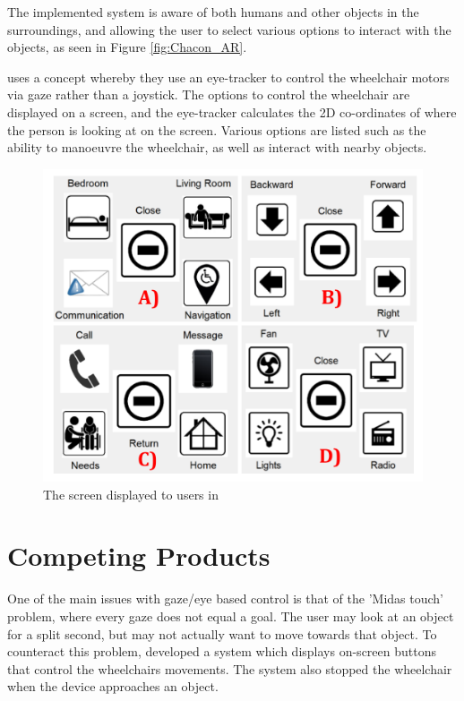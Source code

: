 \documentclass[12pt,a4paper]{report}
\begin{document}
The implemented system is aware of both humans and other objects in the surroundings, and allowing the user to select various options to interact with the objects, as seen in Figure \ref{fig:Chacon_AR}.


\cite{H.Montenegro-Couto2018} uses a concept whereby they use an eye-tracker to control the wheelchair motors via gaze rather than a joystick. The options to control the wheelchair are displayed on a screen, and the eye-tracker calculates the 2D co-ordinates of where the person is looking at on the screen. Various options are listed such as the ability to manoeuvre the wheelchair, as well as interact with nearby objects.

\begin{figure}[h!]
	\begin{center}
		\includegraphics[scale=0.4]{Images/Literature/Eye_Tracker_Control.png}
		\caption{The screen displayed to users in \cite{H.Montenegro-Couto2018}}
	\end{center}
\end{figure}

\newpage

\section{Competing Products}
One of the main issues with gaze/eye based control is that of the 'Midas touch' problem, where every gaze does not equal a goal. The user may look at an object for a split second, but may not actually want to move towards that object. To counteract this problem, \cite{Wastlund2010} developed a system which displays on-screen buttons that control the wheelchairs movements. The system also stopped the wheelchair when the device approaches an object.
\end{document}
